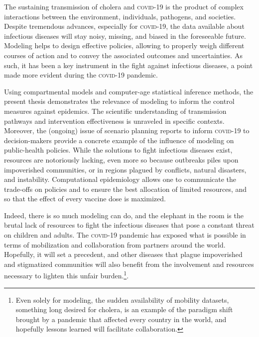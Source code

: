 The sustaining transmission of cholera and \textsc{covid}-19 is the product of complex interactions between the environment, individuals, pathogens, and societies. Despite tremendous advances, especially for \textsc{covid}-19, the data available about infectious diseases will stay noisy, missing, and biased in the foreseeable future. Modeling helps to design effective policies, allowing to properly weigh different courses of action and to convey the associated outcomes and uncertainties. As such, it has been a key instrument in the fight against infectious diseases, a point made more evident during the \textsc{covid}-19 pandemic. 

Using compartmental models and computer-age statistical inference methods, the present thesis demonstrates the relevance of modeling to inform the control measures against epidemics. The scientific understanding of transmission pathways and intervention effectiveness is unraveled in specific contexts. Moreover, the (ongoing) issue of scenario planning reports to inform \textsc{covid}-19 to decision-makers provide a concrete example of the influence of modeling on public-health policies. 
While the solutions to fight infectious diseases exist, resources are notoriously lacking, even more so because outbreaks piles upon impoverished communities, or in regions plagued by conflicts, natural disasters, and instability. Computational epidemiology allows one to communicate the trade-offs on policies and to ensure the best allocation of limited resources, and so that \eg the effect of every vaccine dose is maximized. %

Indeed, there is so much modeling can do, and the elephant in the room is the brutal lack of resources to fight the infectious diseases that pose a constant threat on children and adults. The \textsc{covid}-19 pandemic has exposed what is possible in terms of mobilization and collaboration from partners around the world. Hopefully, it will set a precedent, and other diseases that plague impoverished and stigmatized communities will also benefit from the involvement and resources necessary to lighten this unfair burden.\footnote[][-2\baselineskip]{Even solely for modeling, the sudden availability of mobility datasets, something long desired for cholera, is an example of the paradigm shift brought by a pandemic that affected every country in the world, and hopefully lessons learned will facilitate collaboration.}.

